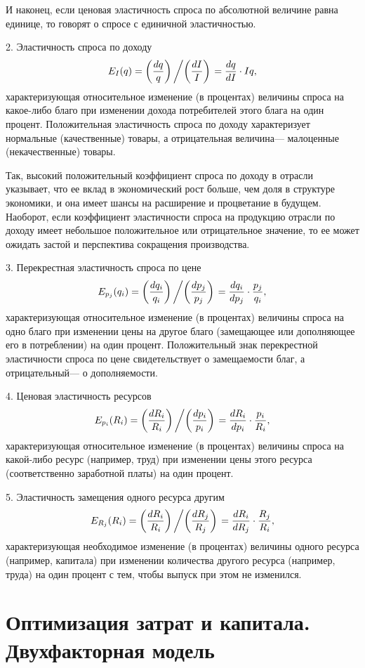 \documentclass[12pt,openbib]{report}
\begin{document}
И наконец, если ценовая эластичность спроса по абсолютной величине
равна единице, то говорят о спросе с единичной эластичностью.

2. Эластичность спроса по доходу
$$E_I(q)=\left(\frac{dq}q\right)\left/\left(\frac{dI}I\right)\right.=\frac{dq}{dI}\cdot
Iq,$$ характеризующая относительное изменение (в процентах) величины
спроса на какое-либо благо при изменении дохода потребителей этого
блага на один процент. Положительная эластичность спроса по доходу
характеризует нормальные (качественные) товары, а отрицательная
величина--- малоценные (некачественные) товары.

Так, высокий положительный коэффициент спроса по доходу в отрасли
указывает, что ее вклад в экономический рост больше, чем доля в
структуре экономики, и она имеет шансы на расширение и процветание в
будущем. Наоборот, если коэффициент эластичности спроса на продукцию
отрасли по доходу имеет небольшое положительное или отрицательное
значение, то ее может ожидать застой и перспектива сокращения
производства.

3. Перекрестная эластичность спроса по цене
$$E_{p_j}(q_i)=\left(\frac{dq_i}{q_i}\right)\left/\left(\frac{dp_j}{p_j}\right)\right.=\frac{dq_i}{dp_j}\cdot\frac
{p_j}{q_i},$$
характеризующая относительное изменение (в процентах) величины
спроса на одно благо при изменении цены на другое благо (замещающее
или дополняющее его в потреблении) на один процент. Положительный
знак перекрестной эластичности спроса по цене свидетельствует о
замещаемости благ, а отрицательный--- о дополняемости.

4. Ценовая эластичность ресурсов
$$E_{p_i}(R_i)=\left(\frac{dR_i}{R_i}\right)\left/\left(\frac{dp_i}{p_i}\right)\right.=\frac{dR_i}{dp_i}\cdot\frac
{p_i}{R_i},$$ характеризующая относительное изменение (в процентах)
величины спроса на какой-либо ресурс (например, труд) при изменении
цены этого ресурса (соответственно заработной платы) на один
процент.

5. Эластичность замещения одного ресурса другим
$$E_{R_j}(R_i)=\left(\frac{dR_i}{R_i}\right)\left/\left(\frac{dR_j}{R_j}\right)\right.=\frac{dR_i}{dR_j}\cdot\frac
{R_j}{R_i},$$
характеризующая необходимое изменение (в процентах) величины одного
ресурса (например, капитала) при изменении количества другого
ресурса (например, труда) на один процент с тем, чтобы выпуск при
этом не изменился.

\section{Оптимизация затрат и капитала. Двухфакторная модель}
\end{document}
